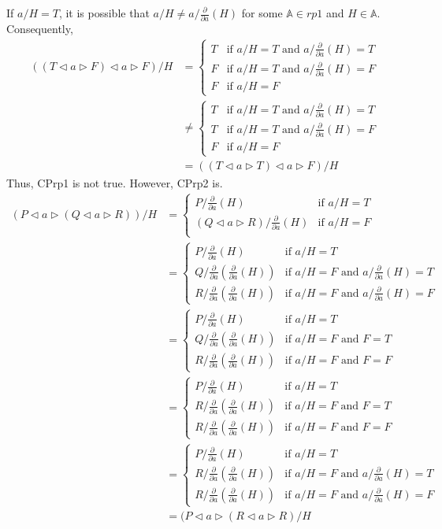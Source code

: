 \documentclass[a4paper,twoside,openright]{report}
\newcommand{\dd}[1]{\frac{\partial}{\partial #1}}
\newcommand{\lef}{\ensuremath{\triangleleft}}
\newcommand{\rig}{\ensuremath{\triangleright}}
\begin{document}
If $a/H=T$, it is possible that $a/H\ne a/\dd a(H)$ for some $\mathbb{A}\in rp1$ and $H\in\mathbb{A}$. Consequently,
\begin{align*}
((T\lef a\rig F)\lef a\rig F)/H
&=\begin{cases}
T & \text{if $a/H=T$ and $a/\dd a(H)=T$}\\
F & \text{if $a/H=T$ and $a/\dd a(H)=F$}\\
F & \text{if $a/H=F$}
\end{cases}\\
&\ne\begin{cases}
T & \text{if $a/H=T$ and $a/\dd a(H)=T$}\\
T & \text{if $a/H=T$ and $a/\dd a(H)=F$}\\
F & \text{if $a/H=F$}
\end{cases}\\
&=((T\lef a \rig T)\lef a\rig F)/H
\end{align*}
Thus, CPrp1 is not true. However, CPrp2 is.
\begin{align*}
(P\lef a\rig(Q\lef a\rig R))/H
&=\begin{cases}
P/\dd a(H) & \text{if $a/H=T$}\\
(Q\lef a\rig R)/\dd a(H) & \text{if $a/H=F$}\\
\end{cases}\\
&=\begin{cases}
P/\dd a(H) & \text{if $a/H=T$}\\
Q/\dd a(\dd a(H)) & \text{if $a/H=F$ and $a/\dd a(H)=T$}\\
R/\dd a(\dd a(H)) & \text{if $a/H=F$ and $a/\dd a(H)=F$}
\end{cases}\\
&=\begin{cases}
P/\dd a(H) & \text{if $a/H=T$}\\
Q/\dd a(\dd a(H)) & \text{if $a/H=F$ and $F=T$}\\
R/\dd a(\dd a(H)) & \text{if $a/H=F$ and $F=F$}
\end{cases}\\
&=\begin{cases}
P/\dd a(H) & \text{if $a/H=T$}\\
R/\dd a(\dd a(H)) & \text{if $a/H=F$ and $F=T$}\\
R/\dd a(\dd a(H)) & \text{if $a/H=F$ and $F=F$}
\end{cases}\\
&=\begin{cases}
P/\dd a(H) & \text{if $a/H=T$}\\
R/\dd a(\dd a(H)) & \text{if $a/H=F$ and $a/\dd a(H)=T$}\\
R/\dd a(\dd a(H)) & \text{if $a/H=F$ and $a/\dd a(H)=F$}
\end{cases}\\
&=(P\lef a\rig(R\lef a\rig R)/H
\end{align*}
\end{document}
